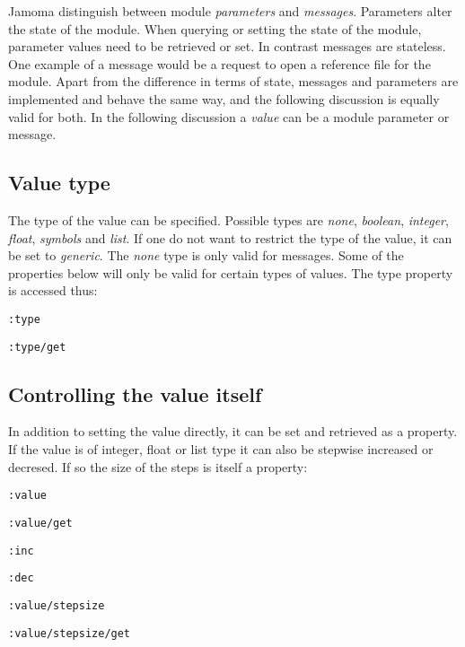 \documentclass{sig-alternate}
\begin{document}
Jamoma distinguish between module \emph{parameters} and \emph{messages}. Parameters alter the state of the module. When querying or setting the state of the module, parameter values need to be retrieved or set. In contrast messages are stateless. One example of a message would be a request to open a reference file for the module. Apart from the difference in terms of state, messages and parameters are implemented and behave the same way, and the following discussion is equally valid for both. In the following discussion a \emph{value} can be a module parameter or message.




\subsection{Value type} %
\label{sub:type}

The type of the value can be specified. Possible types are \emph{none}, \emph{boolean}, \emph{integer}, \emph{float}, \emph{symbols} and \emph{list}. If one do not want to restrict the type of the value, it can be set to \emph{generic}. The \emph{none} type is only valid for messages. Some of the properties below will only be valid for certain types of values. The type property is accessed thus:

\texttt{:type}

\texttt{:type/get}





\subsection{Controlling the value itself} %
\label{sub:controlling_the_value_itself}

In addition to setting the value directly, it can be set and retrieved as a property. If the value is of integer, float or list type it can also be stepwise increased or decresed. If so the size of the steps is itself a property:

\texttt{:value}

\texttt{:value/get}

\texttt{:inc}

\texttt{:dec} 

\texttt{:value/stepsize}

\texttt{:value/stepsize/get}
\end{document}

